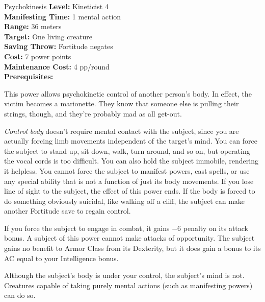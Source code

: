 {Psychokinesis}
{
	\textbf{Level:}
	Kineticist 4\\
	\textbf{Manifesting Time:}
	1 mental action\\
	\textbf{Range:}
	36 meters\\
	\textbf{Target:}
	One living creature\\
	\textbf{Saving Throw:}
	Fortitude negates\\
	\textbf{Cost:}
	7 power points\\
	\textbf{Maintenance Cost:}
	4 pp/round\\
	\textbf{Prerequisites:}
	\\
}
{
	This power allows psychokinetic control of another person's body. In effect, the victim becomes a marionette. They know that someone else is pulling their strings, though, and they're probably mad as all get-out.

	\emph{Control body} doesn't require mental contact with the subject, since you are actually forcing limb movements independent of the target's mind. You can force the subject to stand up, sit down, walk, turn around, and so on, but operating the vocal cords is too difficult. You can also hold the subject immobile, rendering it helpless. You cannot force the subject to manifest powers, cast spells, or use any special ability that is not a function of just its body movements. If you lose line of sight to the subject, the effect of this power ends. If the body is forced to do something obviously suicidal, like walking off a cliff, the subject can make another Fortitude save to regain control.

	If you force the subject to engage in combat, it gains $-6$ penalty on its attack bonus. A subject of this power cannot make attacks of opportunity. The subject gains no benefit to Armor Class from its Dexterity, but it does gain a bonus to its AC equal to your Intelligence bonus.

	Although the subject's body is under your control, the subject's mind is not. Creatures capable of taking purely mental actions (such as manifesting powers) can do so.
}